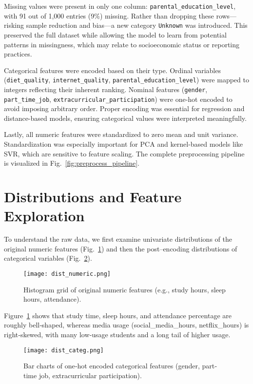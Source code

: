 \documentclass[conference]{IEEEtran}
\begin{document}
Missing values were present in only one column: \texttt{parental\_education\_level}, with 91 out of 1,000 entries (9\%) missing. Rather than dropping these rows—risking sample reduction and bias—a new category \texttt{Unknown} was introduced. This preserved the full dataset while allowing the model to learn from potential patterns in missingness, which may relate to socioeconomic status or reporting practices.

Categorical features were encoded based on their type. Ordinal variables (\texttt{diet\_quality}, \texttt{internet\_quality}, \texttt{parental\_education\_level}) were mapped to integers reflecting their inherent ranking. Nominal features (\texttt{gender}, \texttt{part\_time\_job}, \texttt{extracurricular\_participation}) were one-hot encoded to avoid imposing arbitrary order. Proper encoding was essential for regression and distance-based models, ensuring categorical values were interpreted meaningfully.

Lastly, all numeric features were standardized to zero mean and unit variance. Standardization was especially important for PCA and kernel-based models like SVR, which are sensitive to feature scaling. The complete preprocessing pipeline is visualized in Fig.~\ref{fig:preprocess_pipeline}.


\section{Distributions and Feature Exploration}

To understand the raw data, we first examine univariate distributions of the original numeric features (Fig.~\ref{fig:dist_numeric}) and then the post–encoding distributions of categorical variables (Fig.~\ref{fig:dist_categ}).  

\begin{figure}[htbp]
  \centering
  \texttt{[image: dist\_numeric.png]}
  \caption{Histogram grid of original numeric features (e.g., study hours, sleep hours, attendance).}
  \label{fig:dist_numeric}
\end{figure}

Figure~\ref{fig:dist_numeric} shows that study time, sleep hours, and attendance percentage are roughly bell‐shaped, whereas media usage (social\_media\_hours, netflix\_hours) is right‐skewed, with many low‐usage students and a long tail of higher usage.

\begin{figure}[htbp]
  \centering
  \texttt{[image: dist\_categ.png]}
  \caption{Bar charts of one‐hot encoded categorical features (gender, part‐time job, extracurricular participation).}
  \label{fig:dist_categ}
\end{figure}
\end{document}

